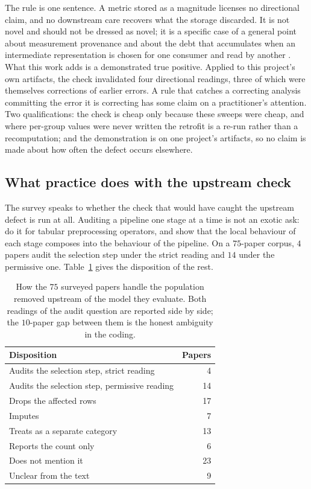 The rule is one sentence. A metric stored as a magnitude licenses no directional
claim, and no downstream care recovers what the storage discarded. It is not
novel and should not be dressed as novel; it is a specific case of a general
point about measurement provenance and about the debt that accumulates when an
intermediate representation is chosen for one consumer and read by another
\citep{sculley2015debt}. What this work adds is a demonstrated true positive.
Applied to this project's own artifacts, the check invalidated four directional
readings, three of which were themselves corrections of earlier errors. A rule
that catches a correcting analysis committing the error it is correcting has some
claim on a practitioner's attention. Two qualifications: the check is cheap only
because these sweeps were cheap, and where per-group values were never written
the retrofit is a re-run rather than a recomputation; and the demonstration is on
one project's artifacts, so no claim is made about how often the defect occurs
elsewhere.

\subsection{What practice does with the upstream check}

The survey speaks to whether the check that would have caught the upstream defect
is run at all. Auditing a pipeline one stage at a time is not an exotic ask:
\citet{biswas2021fairpreprocessing} do it for tabular preprocessing operators,
and show that the local behaviour of each stage composes into the behaviour of
the pipeline. On a $75$-paper corpus, $4$ papers audit the selection step under
the strict reading and $14$ under the permissive one.
Table~\ref{tab:disc-survey} gives the disposition of the rest.

\begin{table}[H]
\centering
\caption{How the $75$ surveyed papers handle the population removed upstream of
the model they evaluate. Both readings of the audit question are reported side by
side; the $10$-paper gap between them is the honest ambiguity in the coding.}
\label{tab:disc-survey}
\begin{tabular}{lr}
\toprule
\textbf{Disposition} & \textbf{Papers} \\
\midrule
Audits the selection step, strict reading     & 4 \\
Audits the selection step, permissive reading & 14 \\
\midrule
Drops the affected rows       & 17 \\
Imputes                       & 7 \\
Treats as a separate category & 13 \\
Reports the count only        & 6 \\
Does not mention it           & 23 \\
Unclear from the text         & 9 \\
\bottomrule
\end{tabular}
\end{table}

